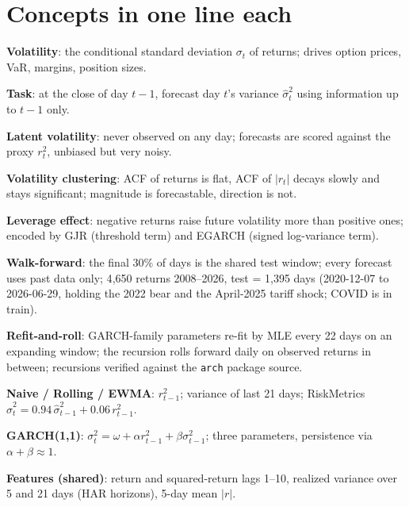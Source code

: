 \documentclass[a4paper,10pt]{article}
\newcommand{\term}[1]{\textbf{#1}:}
\begin{document}

\section*{Concepts in one line each}

\term{Volatility} the conditional standard deviation $\sigma_t$ of returns; drives option prices, VaR, margins, position sizes.

\term{Task} at the close of day $t-1$, forecast day $t$'s variance $\hat\sigma_t^2$ using information up to $t-1$ only.

\term{Latent volatility} never observed on any day; forecasts are scored against the proxy $r_t^2$, unbiased but very noisy.

\term{Volatility clustering} ACF of returns is flat, ACF of $|r_t|$ decays slowly and stays significant; magnitude is forecastable, direction is not.

\term{Leverage effect} negative returns raise future volatility more than positive ones; encoded by GJR (threshold term) and EGARCH (signed log-variance term).

\term{Walk-forward} the final 30\% of days is the shared test window; every forecast uses past data only; 4{,}650 returns 2008--2026, test = 1{,}395 days (2020-12-07 to 2026-06-29, holding the 2022 bear and the April-2025 tariff shock; COVID is in train).

\term{Refit-and-roll} GARCH-family parameters re-fit by MLE every 22 days on an expanding window; the recursion rolls forward daily on observed returns in between; recursions verified against the \texttt{arch} package source.

\term{Naive / Rolling / EWMA} $r_{t-1}^2$; variance of last 21 days; RiskMetrics $\hat\sigma_t^2=0.94\,\hat\sigma_{t-1}^2+0.06\,r_{t-1}^2$.

\term{GARCH(1,1)} $\sigma_t^2=\omega+\alpha r_{t-1}^2+\beta\sigma_{t-1}^2$; three parameters, persistence via $\alpha+\beta\approx 1$.

\term{Features (shared)} return and squared-return lags 1--10, realized variance over 5 and 21 days (HAR horizons), 5-day mean $|r|$.
\end{document}
